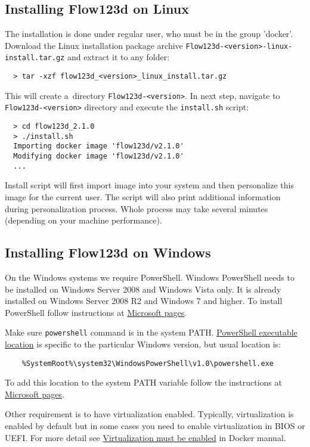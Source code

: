 \documentclass[12pt,a4paper]{report}
\begin{document}
\subsection{Installing Flow123d on Linux}
The installation is done under regular user, who must be in the group 'docker'.
Download the Linux installation package archive \verb'Flow123d-<version>-linux-install.tar.gz' and extract it to any folder:
\begin{verbatim}
  > tar -xzf flow123d_<version>_linux_install.tar.gz 
\end{verbatim}
This will create a~directory \verb'Flow123d-<version>'. In next step, navigate to \verb'Flow123d-<version>' directory
and execute the \verb'install.sh' script:
\begin{verbatim}
  > cd flow123d_2.1.0
  > ./install.sh
  Importing docker image 'flow123d/v2.1.0'
  Modifying docker image 'flow123d/v2.1.0'
  ...
\end{verbatim}
Install script will first import image into your system and then personalize this image for the current user. The script will also print
additional information during personalization process. Whole process may take several minutes (depending on your machine performance).


\subsection{Installing Flow123d on Windows}
On the Windows systems we require PowerShell. Windows PowerShell needs to be installed on Windows Server 2008 and Windows Vista only.
It is already installed on Windows Server 2008 R2 and Windows 7 and higher. To install PowerShell follow instructions at
\href{https://msdn.microsoft.com/en-us/powershell/scripting/setup/installing-windows-powershell}{Microsoft pages}.

Make sure \verb'powershell' command is in the system PATH. 
\href{http://www.powershelladmin.com/wiki/PowerShell_Executables_File_System_Locations}{PowerShell executable location}
 is specific to the particular Windows version, but usual location is:
 \begin{verbatim}
    %SystemRoot%\system32\WindowsPowerShell\v1.0\powershell.exe  
 \end{verbatim}
 To add this location to the system PATH variable follow the instructions at
 \href{https://msdn.microsoft.com/en-us/library/office/ee537574(v=office.14).aspx}{Microsoft pages}.

Other requirement is to have virtualization enabled. Typically, virtualization is enabled by default but in some
cases you need to enable virtualization in BIOS or UEFI. For more detail see 
\href{https://docs.docker.com/docker-for-windows/troubleshoot/#virtualization-must-be-enabled}{Virtualization must be enabled} in Docker manual.
\end{document}

